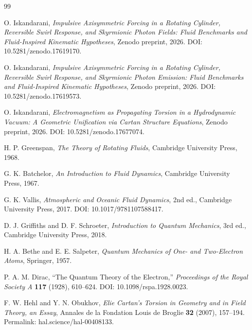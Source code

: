\documentclass[11pt,a4paper]{article}
\begin{document}
\begin{thebibliography}{99}

O. Iskandarani,
\textit{Impulsive Axisymmetric Forcing in a Rotating Cylinder, Reversible Swirl Response, and Skyrmionic Photon Fields: Fluid Benchmarks and Fluid-Inspired Kinematic Hypotheses},
Zenodo preprint, 2026.
DOI: 10.5281/zenodo.17619170.

O. Iskandarani,
\textit{Impulsive Axisymmetric Forcing in a Rotating Cylinder, Reversible Swirl Response, and Skyrmionic Photon Emission: Fluid Benchmarks and Fluid-Inspired Kinematic Hypotheses},
Zenodo preprint, 2026.
DOI: 10.5281/zenodo.17619573.

O. Iskandarani,
\textit{Electromagnetism as Propagating Torsion in a Hydrodynamic Vacuum: A Geometric Unification via Cartan Structure Equations},
Zenodo preprint, 2026.
DOI: 10.5281/zenodo.17677074.

H. P. Greenspan,
\textit{The Theory of Rotating Fluids},
Cambridge University Press, 1968.

G. K. Batchelor,
\textit{An Introduction to Fluid Dynamics},
Cambridge University Press, 1967.

G. K. Vallis,
\textit{Atmospheric and Oceanic Fluid Dynamics},
2nd ed., Cambridge University Press, 2017.
DOI: 10.1017/9781107588417.

D. J. Griffiths and D. F. Schroeter,
\textit{Introduction to Quantum Mechanics},
3rd ed., Cambridge University Press, 2018.

H. A. Bethe and E. E. Salpeter,
\textit{Quantum Mechanics of One- and Two-Electron Atoms},
Springer, 1957.

P. A. M. Dirac,
``The Quantum Theory of the Electron,''
\textit{Proceedings of the Royal Society A} \textbf{117} (1928), 610--624.
DOI: 10.1098/rspa.1928.0023.

F. W. Hehl and Y. N. Obukhov,
\textit{Elie Cartan's Torsion in Geometry and in Field Theory, an Essay},
Annales de la Fondation Louis de Broglie \textbf{32} (2007), 157--194.
Permalink: hal.science/hal-00408133.

\end{thebibliography}
\end{document}

